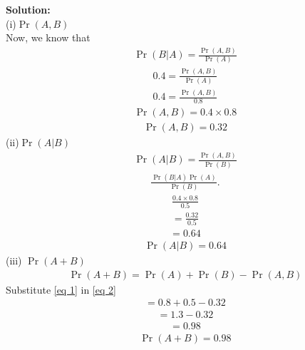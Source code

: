 \documentclass{article}
\newcommand{\solution}{\noindent \textbf{Solution: }}
\providecommand{\pr}[1]{\ensuremath{\Pr\left(#1\right)}}
\begin{document}
\begin{enumerate}[label=13.\arabic{enumi}.\arabic{enumii}]
\solution\\
(i)$\pr{A,B}$
 \\
  Now, we know that
 \begin{align}
\pr{B \vert A}= \frac{\pr{A , B}}{\pr{A}}
 \end{align}
 \begin{align}
 0.4=\frac{\pr{A, B}}{\pr{A}}
 \end{align}
 \begin{align}
 0.4=\frac{\pr{A, B}}{0.8}
 \end{align}
 \begin{align}
 \pr{A,B}=0.4 \times 0.8
 \end{align}
 \begin{align}
 \pr{A,B}=0.32
 \label{eq 1}
 \end{align}
 (ii)$\pr{A \vert B}$
 \begin{align}
 \pr{A \vert B}= \frac{\pr{A,B}}{\pr{B}}
 \end{align}
 \begin{align}
 \frac{\pr{ B \vert A}\pr{A}}{\pr{B}}.
 \end{align}
 \begin{align}
  \frac{0.4 \times 0.8}{0.5}
 \end{align}
 \begin{align}
 = \frac{0.32}{0.5}
 \end{align}
  \begin{align}
 = 0.64
 \end{align}
  \begin{align}
\pr{A \vert B} = 0.64
 \end{align}
 (iii) $\pr{A+B}$
 \begin{align}
 \pr{A+B}= \pr{A}+\pr{B}-\pr{A, B} \label{eq 2}
 \end{align}
 Substitute \eqref{eq 1}  in \eqref{eq 2}
 \begin{align}
 =0.8+0.5-0.32
 \end{align}
 \begin{align}
 =1.3-0.32
 \end{align}
 \begin{align}
 = 0.98
 \end{align}
 \begin{align}
 \pr{A+B}=0.98
 \end{align}
\end{enumerate}
\end{document}
